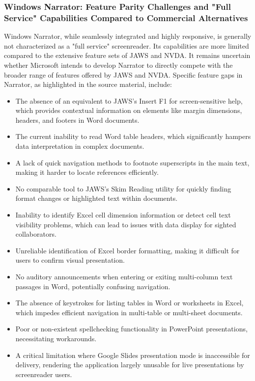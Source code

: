 \subsubsection{Windows Narrator: Feature Parity Challenges and "Full Service" Capabilities Compared to Commercial Alternatives}
Windows Narrator, while seamlessly integrated and highly responsive, is generally not characterized as a "full service" screenreader. Its capabilities are more limited compared to the extensive feature sets of JAWS and NVDA.\supercite{kingsbury2025} It remains uncertain whether Microsoft intends to develop Narrator to directly compete with the broader range of features offered by JAWS and NVDA.\supercite{kingsbury2025}
Specific feature gaps in Narrator, as highlighted in the source material, include:
\begin{itemize}
	\item The absence of an equivalent to JAWS's Insert F1 for screen-sensitive help, which provides contextual information on elements like margin dimensions, headers, and footers in Word documents.\supercite{kingsbury2025}
	\item The current inability to read Word table headers, which significantly hampers data interpretation in complex documents.\supercite{kingsbury2025}
	\item A lack of quick navigation methods to footnote superscripts in the main text, making it harder to locate references efficiently.\supercite{kingsbury2025}
	\item No comparable tool to JAWS's Skim Reading utility for quickly finding format changes or highlighted text within documents.\supercite{kingsbury2025}
	\item Inability to identify Excel cell dimension information or detect cell text visibility problems, which can lead to issues with data display for sighted collaborators.\supercite{kingsbury2025}
	\item Unreliable identification of Excel border formatting, making it difficult for users to confirm visual presentation.\supercite{kingsbury2025}
	\item No auditory announcements when entering or exiting multi-column text passages in Word, potentially confusing navigation.\supercite{kingsbury2025}
	\item The absence of keystrokes for listing tables in Word or worksheets in Excel, which impedes efficient navigation in multi-table or multi-sheet documents.\supercite{kingsbury2025}
	\item Poor or non-existent spellchecking functionality in PowerPoint presentations, necessitating workarounds.\supercite{kingsbury2025}
	\item A critical limitation where Google Slides presentation mode is inaccessible for delivery, rendering the application largely unusable for live presentations by screenreader users.\supercite{kingsbury2025}
\end{itemize}
